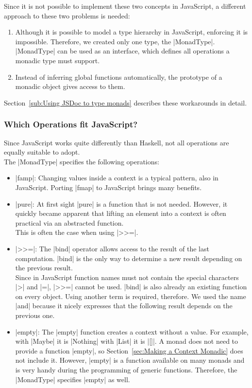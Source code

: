 Since it is not possible to implement these two concepts in JavaScript, a
different approach to these two problems is needed:
\begin{enumerate}
  \item Although it is possible to model a type hierarchy in JavaScript,
    enforcing it is impossible. Therefore, we created only one type, the
    |MonadType|. |MonadType| can be used as an interface, which defines all
    operations a monadic type must support.  
  \item Instead of inferring global functions automatically, the prototype of a
    monadic object gives access to them. \cite{mdn_prototype_2023}
\end{enumerate}
Section~\ref{sub:Using JSDoc to type monads} describes these workarounds in
detail.

\subsubsection{Which Operations fit JavaScript?} %
\label{subsub:Which operations fit JavaScript?}
Since JavaScript works quite differently than Haskell, not all operations are
equally suitable to adopt. \\
The |MonadType| specifies the following operations:
\begin{itemize}
  \item |famp|: Changing values inside a context is a typical pattern,
    also in JavaScript. Porting |fmap| to JavaScript brings many benefits.
  \item |pure|: At first sight |pure| is a function that is not needed.
    However, it quickly became apparent that lifting an element into a context
    is often practical via an abstracted function. 
    \\ This is often the case when using |>>=|.
  \item |>>=|: The |bind| operator allows access to the result of the last
    computation. |bind| is the only way to determine a new result depending on
    the previous result. \\ Since in JavaScript function names must not contain
    the special characters |>| and |=|, |>>=| cannot be used. |bind| is also
    already an existing function on every object. Using another term is
    required, therefore. We used the name |and| because it nicely expresses
    that the following result depends on the previous one.
  \item |empty|: The |empty| function creates a context without a value. For
    example, with |Maybe| it is |Nothing| with |List| it is |[]|. A monad does
    not need to provide a function |empty|, so Section~\ref{sec:Making a
    Context Monadic} does not include it. However, |empty| is a function
    available on many monads and is very handy during the programming of
    generic functions. Therefore, the |MonadType| specifies |empty| as well.

\end{itemize}

